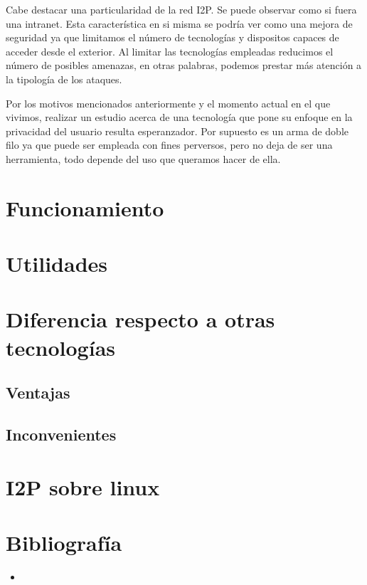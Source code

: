 \documentclass{article}
\begin{document}
Cabe destacar una particularidad de la red I2P. Se puede observar como si fuera una intranet. Esta característica en si misma se podría ver 
como una mejora de seguridad ya que limitamos el número de tecnologías y dispositos capaces de acceder desde el exterior. Al limitar las tecnologías 
empleadas reducimos el número de posibles amenazas, en otras palabras, podemos prestar más atención a la tipología de los ataques. 

Por los motivos mencionados anteriormente y el momento actual en el que vivimos, realizar un estudio acerca de una tecnología que 
pone su enfoque en la privacidad del usuario resulta esperanzador. Por supuesto es un arma de doble filo ya que puede ser empleada con fines 
perversos, pero no deja de ser una herramienta, todo depende del uso que queramos hacer de ella.


\section{Funcionamiento}
\section{Utilidades}
\section{Diferencia respecto a otras tecnologías}
\subsection{Ventajas}
\subsection{Inconvenientes}
\section{I2P sobre linux}
\section{Bibliografía}
\begin{itemize}
    \item %
\end{itemize}
\end{document}
